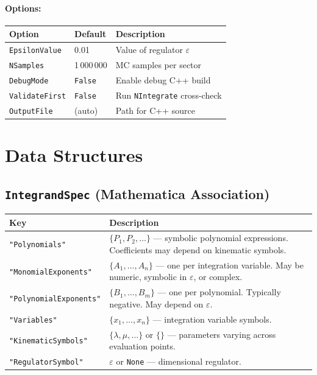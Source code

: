\documentclass[11pt,a4paper]{article}
\begin{document}
\paragraph{Options:}
\begin{center}
\begin{tabular}{lll}
\toprule
\textbf{Option} & \textbf{Default} & \textbf{Description} \\
\midrule
\texttt{EpsilonValue} & 0.01 & Value of regulator $\varepsilon$ \\
\texttt{NSamples} & 1\,000\,000 & MC samples per sector \\
\texttt{DebugMode} & \texttt{False} & Enable debug C++ build \\
\texttt{ValidateFirst} & \texttt{False} & Run \texttt{NIntegrate} cross-check \\
\texttt{OutputFile} & (auto) & Path for C++ source \\
\bottomrule
\end{tabular}
\end{center}

\section{Data Structures}

\subsection{\texttt{IntegrandSpec} (Mathematica Association)}

\begin{center}
\begin{tabular}{lp{9cm}}
\toprule
\textbf{Key} & \textbf{Description} \\
\midrule
\texttt{"Polynomials"} & $\{P_1, P_2, \ldots\}$ --- symbolic polynomial expressions. Coefficients may depend on kinematic symbols. \\
\texttt{"MonomialExponents"} & $\{A_1, \ldots, A_n\}$ --- one per integration variable. May be numeric, symbolic in $\varepsilon$, or complex. \\
\texttt{"PolynomialExponents"} & $\{B_1, \ldots, B_m\}$ --- one per polynomial. Typically negative. May depend on $\varepsilon$. \\
\texttt{"Variables"} & $\{x_1, \ldots, x_n\}$ --- integration variable symbols. \\
\texttt{"KinematicSymbols"} & $\{\lambda, \mu, \ldots\}$ or $\{\}$ --- parameters varying across evaluation points. \\
\texttt{"RegulatorSymbol"} & $\varepsilon$ or \texttt{None} --- dimensional regulator. \\
\bottomrule
\end{tabular}
\end{center}
\end{document}
